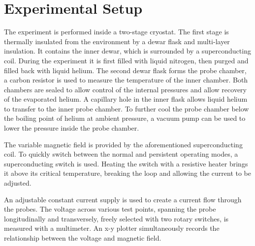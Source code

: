 \section{Experimental Setup}
The experiment is performed inside a two-stage cryostat.
The first stage is thermally insulated from the environment by a dewar flask and multi-layer insulation.
It contains the inner dewar, which is surrounded by a superconducting coil.
During the experiment it is first filled with liquid nitrogen, then purged and filled back with liquid helium.
The second dewar flask forms the probe chamber, a carbon resistor is used to measure the temperature of the inner chamber.
Both chambers are sealed to allow control of the internal pressures and allow recovery of the evaporated helium.
A capillary hole in the inner flask allows liquid helium to transfer to the inner probe chamber.
To further cool the probe chamber below the boiling point of helium at ambient pressure, a vacuum pump can be used to lower the pressure inside the probe chamber.

The variable magnetic field is provided by the aforementioned superconducting coil.
To quickly switch between the normal and persistent operating modes, a superconducting switch is used.
Heating the switch with a resistive heater brings it above its critical temperature, breaking the loop and allowing the current to be adjusted.

An adjustable constant current supply is used to create a current flow through the probes.
The voltage across various test points, spanning the probe longitudinally and transversely, freely selected with two rotary switches, is measured with a multimeter.
An x-y plotter simultaneously records the relationship between the voltage and magnetic field.
